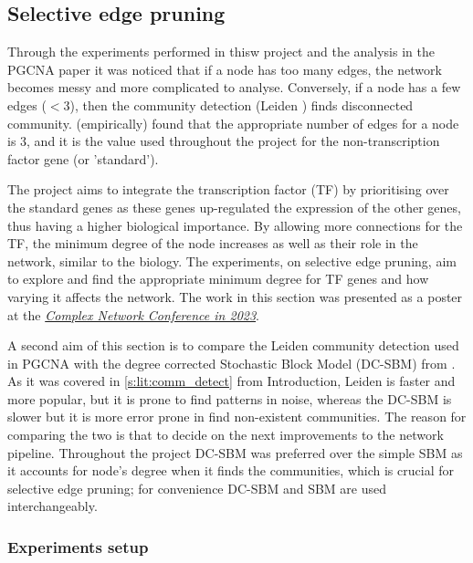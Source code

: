 \subsection{Selective edge pruning} \label{s:N_I:sel_pruning}

Through the experiments performed in thisw project and the analysis in the PGCNA paper \cite{Care2019-ij} it was noticed that if a node has too many edges, the network becomes messy and more complicated to analyse. Conversely, if a node has a few edges ($<3$), then the community detection (Leiden \citet{Traag2019-ne}) finds disconnected community. \cite{Care2019-ij} (empirically) found that the appropriate number of edges for a node is 3, and it is the value used throughout the project for the non-transcription factor gene (or 'standard'). 

The project aims to integrate the transcription factor (TF) by prioritising over the standard genes as these genes up-regulated the expression of the other genes, thus having a higher biological importance. By allowing more connections for the TF, the minimum degree of the node increases as well as their role in the network, similar to the biology. The experiments, on selective edge pruning, aim to explore and find the appropriate minimum degree for TF genes and how varying it affects the network. The work in this section was presented as a poster at the \textit{\href{https://2023.complexnetworks.org/}{Complex Network Conference in 2023}}.

A second aim of this section is to compare the Leiden \citet{Traag2019-ne} community detection used in PGCNA with the degree corrected Stochastic Block Model (DC-SBM) from \cite{Karrer2011-si, Peixoto2017-gc}. As it was covered in \cref{s:lit:comm_detect} from Introduction, Leiden is faster and more popular, but it is prone to find patterns in noise, whereas the DC-SBM is slower but it is more error prone in find non-existent communities. The reason for comparing the two is that to decide on the next improvements to the network pipeline. Throughout the project DC-SBM was preferred over the simple SBM \cite{Holland1983-eu} as it accounts for node's degree when it finds the communities, which is crucial for selective edge pruning; for convenience DC-SBM and SBM are used interchangeably.

\subsubsection{Experiments setup}


